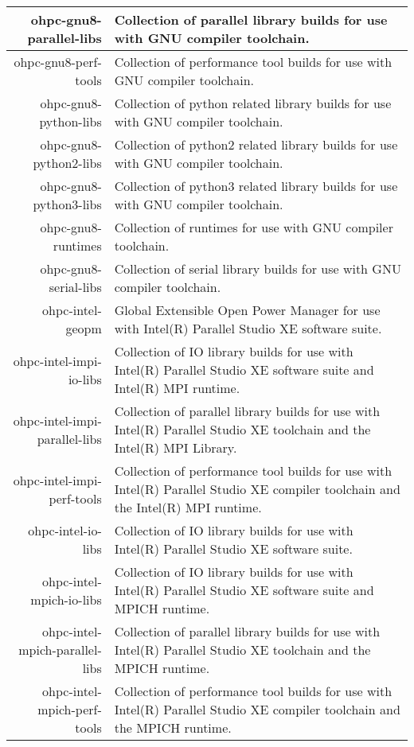 \begin{tabularx}{\textwidth}{r|X}
\hline
ohpc-gnu8-parallel-libs & Collection of parallel library builds for use with GNU compiler toolchain. \\ 
\hline
ohpc-gnu8-perf-tools & Collection of performance tool builds for use with GNU compiler toolchain. \\ 
\hline
ohpc-gnu8-python-libs & Collection of python related library builds for use with GNU compiler toolchain. \\ 
\hline
ohpc-gnu8-python2-libs & Collection of python2 related library builds for use with GNU compiler toolchain. \\ 
\hline
ohpc-gnu8-python3-libs & Collection of python3 related library builds for use with GNU compiler toolchain. \\ 
\hline
ohpc-gnu8-runtimes & Collection of runtimes for use with GNU compiler toolchain. \\ 
\hline
ohpc-gnu8-serial-libs & Collection of serial library builds for use with GNU compiler toolchain. \\ 
\hline
ohpc-intel-geopm & Global Extensible Open Power Manager for use with Intel(R) Parallel Studio XE software suite. \\ 
\hline
ohpc-intel-impi-io-libs & Collection of IO library builds for use with Intel(R) Parallel Studio XE software suite and Intel(R) MPI runtime. \\ 
\hline
ohpc-intel-impi-parallel-libs & Collection of parallel library builds for use with Intel(R) Parallel Studio XE toolchain and the Intel(R) MPI Library. \\ 
\hline
ohpc-intel-impi-perf-tools & Collection of performance tool builds for use with Intel(R) Parallel Studio XE compiler toolchain and the Intel(R) MPI runtime. \\ 
\hline
ohpc-intel-io-libs & Collection of IO library builds for use with Intel(R) Parallel Studio XE software suite. \\ 
\hline
ohpc-intel-mpich-io-libs & Collection of IO library builds for use with Intel(R) Parallel Studio XE software suite and MPICH runtime. \\ 
\hline
ohpc-intel-mpich-parallel-libs & Collection of parallel library builds for use with Intel(R) Parallel Studio XE toolchain and the MPICH runtime. \\ 
\hline
ohpc-intel-mpich-perf-tools & Collection of performance tool builds for use with Intel(R) Parallel Studio XE compiler toolchain and the MPICH runtime. \\ 
\hline
\bottomrule
\end{tabularx}
